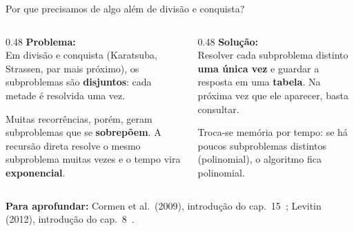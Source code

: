 \documentclass[aspectratio=169,xcolor=table]{beamer}
\newcommand{\fonte}[1]{%
  \vfill
  {\tiny\color{gray!55!black}\textbf{Para aprofundar:} #1\par}%
}
\begin{document}
\begin{frame}{Por que precisamos de algo além de divisão e conquista?}
  \begin{columns}[T]
    \begin{column}{0.48\textwidth}
      \textbf{Problema:}\\[2pt]
      \scriptsize Em divisão e conquista (Karatsuba, Strassen, par mais próximo), os
      subproblemas são \textbf{disjuntos}: cada metade é resolvida uma vez.
      \medskip

      Muitas recorrências, porém, geram subproblemas que se \textbf{sobrepõem}. A recursão
      direta resolve o mesmo subproblema muitas vezes e o tempo vira
      \textbf{exponencial}.
    \end{column}
    \begin{column}{0.48\textwidth}
      \textbf{Solução:}\\[2pt]
      \scriptsize Resolver cada subproblema distinto \textbf{uma única vez} e guardar a
      resposta em uma \textbf{tabela}. Na próxima vez que ele aparecer, basta consultar.
      \medskip

      Troca-se memória por tempo: se há poucos subproblemas distintos (polinomial), o
      algoritmo fica polinomial.
    \end{column}
  \end{columns}
  \fonte{Cormen et al.\ (2009), introdução do cap.~15~\cite{cormen2009introduction};
    Levitin (2012), introdução do cap.~8~\cite{levitin2012introduction}.}
\end{frame}
\end{document}
